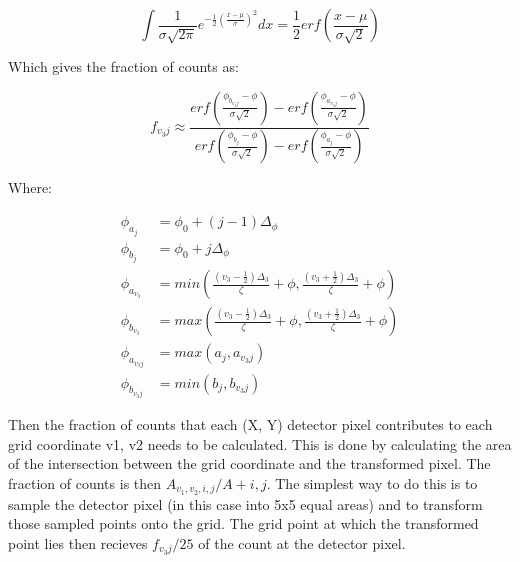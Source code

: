 \documentclass[a4paper,10pt]{article}
\begin{document}
\begin{equation}
  \int \frac{1} {\sigma \sqrt{2 \pi}} e^{
        - \frac{1} {2} \left(\frac{x - \mu} {\sigma} \right)^2} dx
    = \frac{1} {2} erf \left(\frac{x - \mu} {\sigma \sqrt{2}} \right)
\end{equation}

Which gives the fraction of counts as:


\begin{equation}
  f_{{v_3}j} \approx \frac{
    erf \left(\frac{\phi_{b_{{v_3}j}} - \phi} {\sigma \sqrt{2}} \right) -   
    erf \left(\frac{\phi_{a_{{v_3}j}} - \phi} {\sigma \sqrt{2}} \right)
  }{
    erf \left(\frac{\phi_{b_j} - \phi} {\sigma \sqrt{2}} \right) -   
    erf \left(\frac{\phi_{a_j} - \phi} {\sigma \sqrt{2}} \right)
  }
\end{equation}

Where:

\begin{equation}
  \begin{aligned}
    \phi_{a_j}          &= \phi_0 + (j - 1) \Delta_\phi \\
    \phi_{b_j}          &= \phi_0 + j \Delta_\phi \\
    \phi_{a_{v_3}}      &= min \left(
                          \frac{(v_3 - \frac{1}{2}) \Delta_3} {\zeta} + \phi,
                          \frac{(v_3 + \frac{1}{2}) \Delta_3} {\zeta} + \phi
                          \right) \\
    \phi_{b_{v_3}}      &= max \left(
                          \frac{(v_3 - \frac{1}{2}) \Delta_3} {\zeta} + \phi,
                          \frac{(v_3 + \frac{1}{2}) \Delta_3} {\zeta} + \phi
                          \right) \\
    \phi_{{a_{{v_3}j}}} &= max(a_j, a_{{v_3}j}) \\
    \phi_{{b_{{v_3}j}}} &= min(b_j, b_{{v_3}j})
  \end{aligned}
\end{equation}

Then the fraction of counts that each (X, Y) detector pixel contributes to each 
grid coordinate v1, v2 needs to be calculated. This is done by calculating the
area of the intersection between the grid coordinate and the transformed pixel.
The fraction of counts is then $A_{{v_1},{v_2},i,j} / A+{i,j}$. The simplest way
to do this is to sample the detector pixel (in this case into 5x5 equal areas)
and to transform those sampled points onto the grid. The grid point at which the
transformed point lies then recieves $f_{{v_3}j} / 25$ of the count at the
detector pixel.
\end{document}
